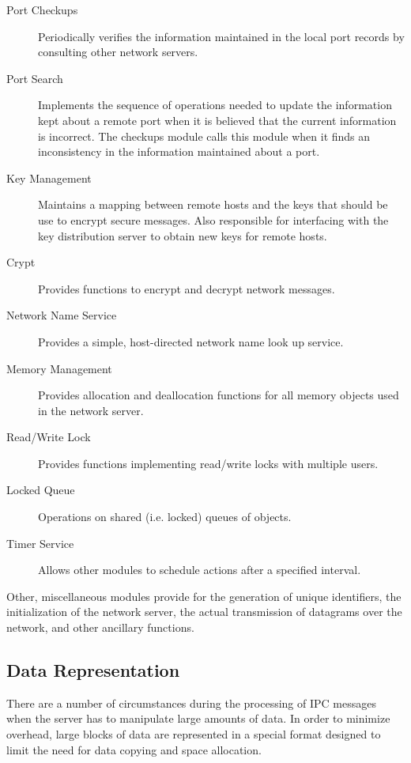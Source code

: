 \begin{description}
\item[Port Checkups] Periodically verifies the information maintained in the
local port records by consulting other network servers.

\item[Port Search] Implements the sequence of operations needed to update the
information kept about a remote port when it is believed that the current
information is incorrect.  The checkups module calls this module when it
finds an inconsistency in the information maintained about a port.

\item[Key Management] Maintains a mapping between remote hosts and the keys
that should be use to encrypt secure messages.  Also responsible for
interfacing with the key distribution server to obtain new keys for
remote hosts.

\item[Crypt] Provides functions to encrypt and decrypt network messages.

\item[Network Name Service] Provides a simple, host-directed network name
look up service.

\item[Memory Management] Provides allocation and deallocation functions for
all memory objects used in the network server.

\item[Read/Write Lock] Provides functions implementing read/write locks with
multiple users.

\item[Locked Queue] Operations on shared (i.e. locked) queues of objects.

\item[Timer Service] Allows other modules to schedule actions after a
specified interval.
\end{description}

Other, miscellaneous modules provide for the generation of unique
identifiers, the initialization of the network server, the actual
transmission of datagrams over the network, and other ancillary
functions. 


\subsection{Data Representation}
There are a number of circumstances during the processing of IPC messages
when the server has to manipulate large amounts of data.  In order to
minimize overhead, large blocks of data are represented in a special format
designed to limit the need for data copying and space allocation.

